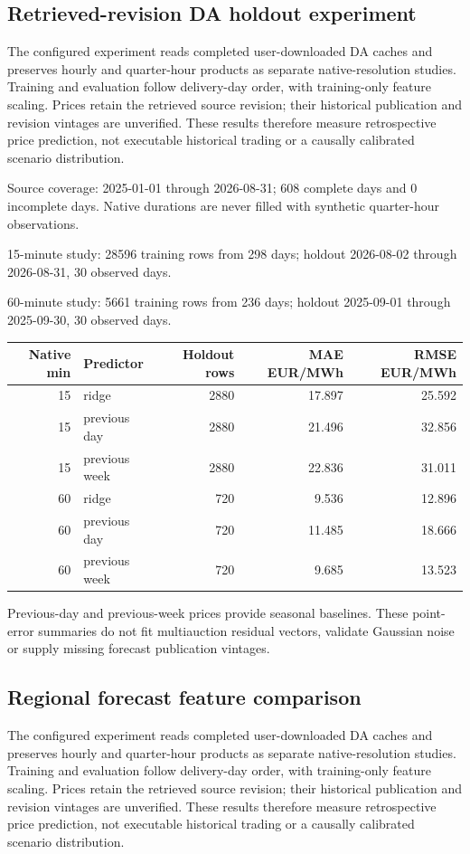 \documentclass[11pt,a4paper]{article}
\begin{document}
\subsection{Retrieved-revision DA holdout experiment}

The configured experiment reads completed user-downloaded DA caches and preserves hourly and quarter-hour products as separate native-resolution studies. Training and evaluation follow delivery-day order, with training-only feature scaling. Prices retain the retrieved source revision; their historical publication and revision vintages are unverified. These results therefore measure retrospective price prediction, not executable historical trading or a causally calibrated scenario distribution.

Source coverage: 2025-01-01 through 2026-08-31; 608 complete days and 0 incomplete days. Native durations are never filled with synthetic quarter-hour observations.

15-minute study: 28596 training rows from 298 days; holdout 2026-08-02 through 2026-08-31, 30 observed days.

60-minute study: 5661 training rows from 236 days; holdout 2025-09-01 through 2025-09-30, 30 observed days.

{\small\begin{longtable}{rlrrr}
\toprule Native min & Predictor & Holdout rows & MAE EUR/MWh & RMSE EUR/MWh \\ \midrule
\endhead
15 & ridge & 2880 & 17.897 & 25.592 \\
15 & previous day & 2880 & 21.496 & 32.856 \\
15 & previous week & 2880 & 22.836 & 31.011 \\
60 & ridge & 720 & 9.536 & 12.896 \\
60 & previous day & 720 & 11.485 & 18.666 \\
60 & previous week & 720 & 9.685 & 13.523 \\
\bottomrule\end{longtable}}

Previous-day and previous-week prices provide seasonal baselines. These point-error summaries do not fit multiauction residual vectors, validate Gaussian noise or supply missing forecast publication vintages.
\subsection{Regional forecast feature comparison}

The configured experiment reads completed user-downloaded DA caches and preserves hourly and quarter-hour products as separate native-resolution studies. Training and evaluation follow delivery-day order, with training-only feature scaling. Prices retain the retrieved source revision; their historical publication and revision vintages are unverified. These results therefore measure retrospective price prediction, not executable historical trading or a causally calibrated scenario distribution.
\end{document}
